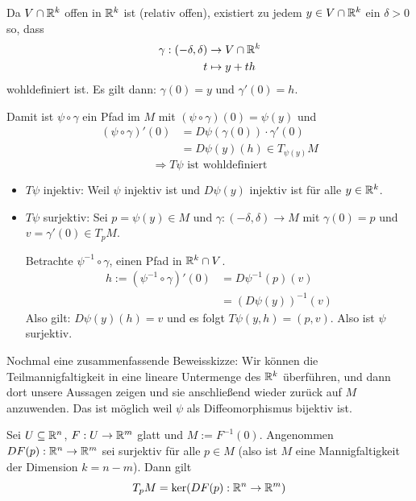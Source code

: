 \documentclass[main.tex]{subfiles}
\begin{document}
\begin{Beweis}
  Da $V \cap \mathbb{R}^k$ offen in $\mathbb{R}^k$ ist (relativ offen), existiert zu jedem $y \in V \cap \mathbb{R}^k$ ein $\delta >0$ so, dass
  $$\begin{aligned}
    \gamma: (-\delta, \delta) & \to V \cap \mathbb{R}^k \\
    t & \mapsto y + th
  \end{aligned}$$
  wohldefiniert ist. Es gilt dann: $\gamma(0) = y$ und $\gamma'(0) = h$.

  Damit ist $\psi \circ \gamma$ ein Pfad im $M$ mit $(\psi \circ \gamma)(0) = \psi(y)$ und
  $$\begin{aligned}
    (\psi \circ \gamma)'(0) & = D \psi(\gamma(0))\cdot \gamma'(0)\\
    & = D\psi(y)(h) \in T_{\psi(y)} M
  \end{aligned}$$
  $$\Rightarrow T \psi \text{ ist wohldefiniert}$$
  \begin{itemize}
    \item $T\psi$ injektiv: Weil $\psi$ injektiv ist und $D\psi(y)$ injektiv ist für alle $y \in \mathbb{R}^k$.
    \item $T \psi$ surjektiv: Sei $p = \psi(y) \in M$ und $\gamma: (-\delta,\delta) \to M$ mit $\gamma(0) = p$ und $v = \gamma'(0) \in T_p M$.

      Betrachte $\psi^{-1} \circ \gamma$, einen Pfad in $\mathbb{R}^k \cap V$.
      $$\begin{aligned}
        h:= (\psi^{-1} \circ \gamma)'(0) & = D \psi^{-1}(p)(v) \\
        & = (D \psi(y))^{-1}(v)
      \end{aligned}$$
      Also gilt: $D\psi(y)(h) = v$ und es folgt $T\psi(y,h) = (p,v)$. Also ist $\psi$ surjektiv.
  \end{itemize}
  Nochmal eine zusammenfassende Beweisskizze: Wir können die Teilmannigfaltigkeit in eine lineare Untermenge des $\mathbb{R}^k$ überführen, und dann dort unsere Aussagen zeigen und sie anschließend wieder zurück auf $M$ anzuwenden. Das ist möglich weil $\psi$ als Diffeomorphismus bijektiv ist.
\end{Beweis}

\begin{Theorem}
  Sei $U \subseteq \mathbb{R}^n$, $F: U \to \mathbb{R}^m$ glatt und $M:=F^{-1}(0)$. Angenommen $DF(p): \mathbb{R}^n \to \mathbb{R}^m$ sei surjektiv für alle $p \in M$ (also ist $M$ eine Mannigfaltigkeit der Dimension $k = n - m$). Dann gilt
  $$T_p M = \ker(DF(p): \mathbb{R}^n \to \mathbb{R}^m)$$
\end{Theorem}
\end{document}
